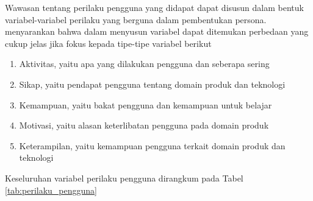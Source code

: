 Wawasan tentang perilaku pengguna yang didapat dapat disusun dalam bentuk variabel-variabel perilaku yang berguna dalam pembentukan persona. \textcite{cooper2014face} menyarankan bahwa dalam menyusun variabel dapat ditemukan perbedaan yang cukup jelas jika fokus kepada tipe-tipe variabel berikut
\begin{enumerate}
  \item Aktivitas, yaitu apa yang dilakukan pengguna dan seberapa sering 
  \item Sikap, yaitu pendapat pengguna tentang domain produk dan teknologi
  \item Kemampuan, yaitu bakat pengguna dan kemampuan untuk belajar
  \item Motivasi, yaitu alasan keterlibatan pengguna pada domain produk 
  \item Keterampilan, yaitu kemampuan pengguna terkait domain produk dan teknologi
\end{enumerate}

Keseluruhan variabel perilaku pengguna dirangkum pada Tabel \ref{tab:perilaku_pengguna}

\newpage


